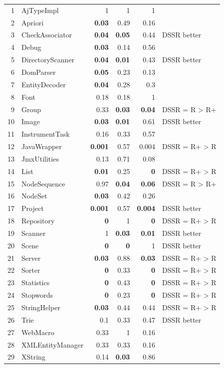 \documentclass{acm_proc_article-sp}
\begin{document}
\begin{table}[htp]
\begin{tabular}{rlrrrl}
1		&	AjTypeImpl		&	1 				& 1 			& 1			& 		\\	
2		&	Apriori			&	\textbf{0.03}	 	& 0.49		& 0.16		&		\\	
3		&	CheckAssociator	&	\textbf{0.04}	 	& \textbf{0.05}	& 0.44		& DSSR better		\\	
4		&	Debug			&	\textbf{0.03}	 	& 0.14		& 0.56		&		\\	
5		&	DirectoryScanner	&	\textbf{0.04}	 	& \textbf{0.01}	& 0.43		& DSSR better		\\
6		&	DomParser		&	\textbf{0.05}	 	& 0.23		& 0.13		&				\\
7		&	EntityDecoder		&	\textbf{0.04}	 	& 0.28		& 0.3			&		\\			
8		&	Font				&	0.18	 			& 0.18		& 1			&		\\
9		&	Group			&	0.33	 			& \textbf{0.03}	& \textbf{0.04}	& DSSR = R > R+	\\
10		&	Image			&	\textbf{0.03}		& \textbf{0.01}	& 0.61		& DSSR better \\		
11		&	InstrumentTask		&	0.16				& 0.33		& 0.57		& \\
12		&	JavaWrapper		&	\textbf{0.001}		& 0.57		& 0.004		& DSSR = R+ > R \\
13		& 	JmxUtilities		&	0.13				& 0.71		& 0.08		&	\\
14		&	List				& 	\textbf{0.01}		&0.25		&\textbf{0}		& DSSR = R+ > R \\
15		&	NodeSequence	&	0.97				&\textbf{0.04}	&\textbf{0.06}	& DSSR = R > R+ \\
16		&	NodeSet			&	\textbf{0.03}		&0.42		&0.26		& 	\\
17		&	Project			&	\textbf{0.001}		&0.57		&\textbf{0.004}	& DSSR better \\		
18		&	Repository		&	\textbf{0}			&1			&\textbf{0}		& DSSR = R+ > R \\
19		&	Scanner			&	1				&\textbf{0.03}	&\textbf{0.01}	& DSSR better \\
20		&	Scene			&	\textbf{0}			&\textbf{0}		& 1			& DSSR better \\
21		&	Server			&	\textbf{0.03}		& 0.88		&\textbf{0.03} 	& DSSR = R+ > R \\
22		&	Sorter			& 	\textbf{0}			& 0.33		&\textbf{0}		& DSSR = R+ > R \\
23		&	Statistics			&	\textbf{0}			& 0.43		&\textbf{0}		& DSSR = R+ > R\\
24		&	Stopwords		&	\textbf{0}			& 0.23		&\textbf{0}		& DSSR = R+ > R \\
25		&	StringHelper		&	\textbf{0.03}		& 0.44		&0.44		& DSSR = R+ > R\\
26		& 	Trie				&	0.1				& 0.33		&0.47		& DSSR better \\
27		&	WebMacro		&	0.33				& 1			&0.16		& \\
28		&	XMLEntityManager	&	0.33				& 0.33		&0.16		& \\
29 		&	XString			&	0.14				&\textbf{0.03}	&0.86		& \\


\end{tabular}
\bigskip
\label{table:ttest}
\end{table}
\end{document}
